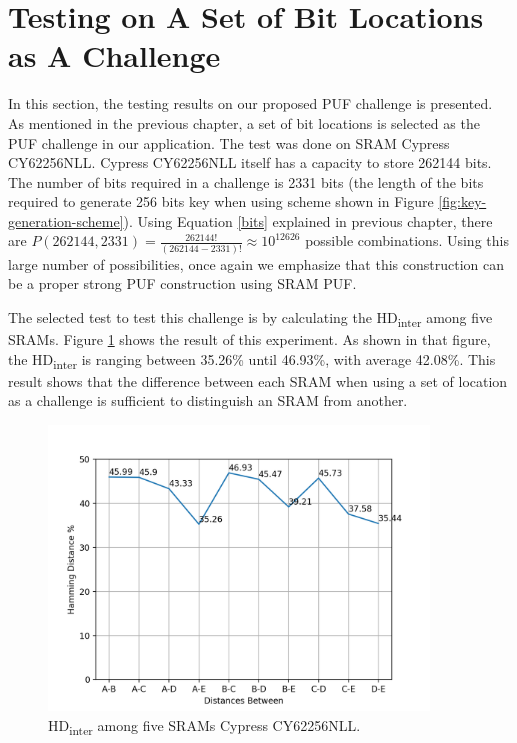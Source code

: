 \section{Testing on A Set of Bit Locations as A Challenge}
In this section, the testing results on our proposed PUF challenge is presented. As mentioned in the previous chapter, a set of bit locations is selected as the PUF challenge in our application. The test was done on SRAM Cypress CY62256NLL. Cypress CY62256NLL itself has a capacity to store 262144 bits. The number of bits required in a challenge is 2331 bits (the length of the bits required to generate 256 bits key when using scheme shown in Figure \ref{fig:key-generation-scheme}). Using Equation \ref{bits} explained in previous chapter, there are $P(262144, 2331)=\frac{262144!}{\left( 262144-2331 \right) !}\approx 10^{12626}$ possible combinations. Using this large number of possibilities, once again we emphasize that this construction can be a proper strong PUF construction using SRAM PUF.

The selected test to test this challenge is by calculating the HD\textsubscript{inter} among five SRAMs. Figure \ref{fig:cy62256cy62256nll_hd_inter_stable_remanences} shows the result of this experiment. As shown in that figure, the HD\textsubscript{inter} is ranging between 35.26\% until 46.93\%, with average 42.08\%. This result shows that the difference between each SRAM when using a set of location as a challenge is sufficient to distinguish an SRAM from another.

\begin{figure}[tph!]
    \centerline{\includegraphics[width={0.9\textwidth}]{images/cy62256nll_hd_inter_stable_remanences}}
    \caption{HD\textsubscript{inter} among five SRAMs Cypress CY62256NLL. }
    \label{fig:cy62256cy62256nll_hd_inter_stable_remanences}
\end{figure}

